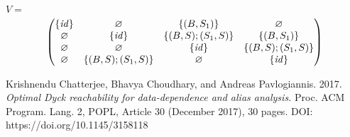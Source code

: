 \documentclass[12pt]{article}  %
\theoremstyle{definition}
\theoremstyle{remark}
\begin{document}
$V=$
\begin{align*}
\begin{pmatrix}
      \{ \text{\emph{id}} \}       & \varnothing       & \{(B,S_1)\}       & \varnothing  \\ 
      \varnothing       & \{ \text{\emph{id}} \}       & \{(B,S);(S_1,S)\} & \{(B,S_1)\}  \\
      \varnothing       & \varnothing       & \{ \text{\emph{id}} \}       & \{(B,S);(S_1,S)\}  \\
      \varnothing       & \{(B,S);(S_1,S)\} & \varnothing       & \{ \text{\emph{id}} \}  \\
\end{pmatrix}
\end{align*}



\begin{thebibliography}{9}

Krishnendu Chatterjee, Bhavya Choudhary, and Andreas Pavlogiannis. 
2017. 
\emph{Optimal Dyck reachability for data-dependence and alias analysis.}
Proc. ACM Program. Lang. 2, POPL, Article 30 (December 2017), 30 pages. DOI: 
https://doi.org/10.1145/3158118




\end{thebibliography}
\end{document}
